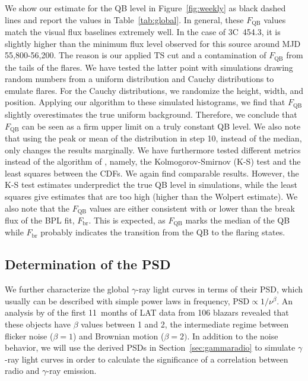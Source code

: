 \documentclass[twocolumn]{aastex62}
\newcommand{\gray}{$\gamma$-ray\xspace}
\begin{document}
We show our estimate for the QB level in Figure~\ref{fig:weekly} as black dashed lines and report the values in Table~\ref{tab:global}.
In general, these $F_\mathrm{QB}$ values match 
the visual flux baselines extremely well. 
In the case of 3C~454.3, it is slightly higher than the minimum flux level observed for this source around MJD 55,800-56,200. The reason is our applied $\mathrm{TS}$ cut and a contamination of $F_\mathrm{QB}$ from the tails of the flares. 
We have tested the latter point with simulations drawing random numbers from a uniform distribution and Cauchy distributions to emulate flares. 
For the Cauchy distributions, we randomize the height, width, and position. 
Applying our algorithm to these simulated histograms, we find that $F_\mathrm{QB}$ slightly overestimates the true uniform background. Therefore, we conclude that $F_\mathrm{QB}$ can be seen as a firm upper limit on a truly constant QB level. 
We also note that using the peak or mean of the distribution in step 10, instead of the median,  only changes the results marginally. 
We have furthermore tested different metrics instead of the algorithm of \citet{Wolpert1996}, namely, the Kolmogorov-Smirnov (K-S) test and the least squares between the CDFs. 
We again find comparable results. However, the K-S test estimates underpredict the true QB level in simulations, while the least squares give estimates that are too high  (higher than the Wolpert estimate).
We also note that the $F_\mathrm{QB}$ values are either consistent with or lower than the break flux of the BPL fit, $F_\mathrm{br}$.
This is expected, as $F_\mathrm{QB}$ marks the median of the QB while $F_\mathrm{br}$ probably indicates the transition from the QB to the flaring states. 

\subsection{Determination of the PSD}
We further characterize the global \gray light curves in terms of their PSD,
which usually can be described with simple power laws in frequency,  $\mathrm{PSD} \propto 1 / \nu^\beta$.
An analysis by \citet{2010ApJ...722..520A} of the first 11~months of LAT data from 106 blazars revealed that 
these objects have $\beta$ values between 1 and 2, the intermediate regime between flicker noise ($\beta = 1$) and Brownian motion ($\beta = 2)$. 
In addition to the noise behavior, 
we will use the derived PSDs in Section~\ref{sec:gammaradio} to simulate \gray light curves in order to calculate the significance of a correlation between radio and \gray emission. 
\end{document}
